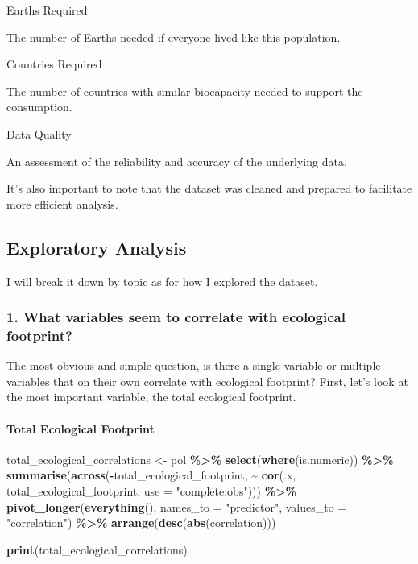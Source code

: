 \documentclass[
]{article}
\newenvironment{Shaded}{\begin{snugshade}}{\end{snugshade}}
\newcommand{\AttributeTok}[1]{\textcolor[rgb]{0.13,0.29,0.53}{#1}}
\newcommand{\FunctionTok}[1]{\textcolor[rgb]{0.13,0.29,0.53}{\textbf{#1}}}
\newcommand{\NormalTok}[1]{#1}
\newcommand{\OtherTok}[1]{\textcolor[rgb]{0.56,0.35,0.01}{#1}}
\newcommand{\SpecialCharTok}[1]{\textcolor[rgb]{0.81,0.36,0.00}{\textbf{#1}}}
\newcommand{\StringTok}[1]{\textcolor[rgb]{0.31,0.60,0.02}{#1}}
\begin{document}
Earths Required

The number of Earths needed if everyone lived like this population.

Countries Required

The number of countries with similar biocapacity needed to support the
consumption.

Data Quality

An assessment of the reliability and accuracy of the underlying data.

It's also important to note that the dataset was cleaned and prepared to
facilitate more efficient analysis.

\subsection{Exploratory Analysis}\label{exploratory-analysis}

I will break it down by topic as for how I explored the dataset.

\subsubsection{1. What variables seem to correlate with ecological
footprint?}\label{what-variables-seem-to-correlate-with-ecological-footprint}

The most obvious and simple question, is there a single variable or
multiple variables that on their own correlate with ecological
footprint? First, let's look at the most important variable, the total
ecological footprint.

\paragraph{Total Ecological Footprint}\label{total-ecological-footprint}

\begin{Shaded}
\begin{Highlighting}[]
\NormalTok{total\_ecological\_correlations }\OtherTok{\textless{}{-}}\NormalTok{ pol }\SpecialCharTok{\%\textgreater{}\%}
  \FunctionTok{select}\NormalTok{(}\FunctionTok{where}\NormalTok{(is.numeric)) }\SpecialCharTok{\%\textgreater{}\%}
  \FunctionTok{summarise}\NormalTok{(}\FunctionTok{across}\NormalTok{(}\SpecialCharTok{{-}}\NormalTok{total\_ecological\_footprint, }
                   \SpecialCharTok{\textasciitilde{}} \FunctionTok{cor}\NormalTok{(.x, total\_ecological\_footprint, }\AttributeTok{use =} \StringTok{"complete.obs"}\NormalTok{))) }\SpecialCharTok{\%\textgreater{}\%}
  \FunctionTok{pivot\_longer}\NormalTok{(}\FunctionTok{everything}\NormalTok{(), }\AttributeTok{names\_to =} \StringTok{"predictor"}\NormalTok{, }\AttributeTok{values\_to =} \StringTok{"correlation"}\NormalTok{) }\SpecialCharTok{\%\textgreater{}\%}
  \FunctionTok{arrange}\NormalTok{(}\FunctionTok{desc}\NormalTok{(}\FunctionTok{abs}\NormalTok{(correlation)))}

\FunctionTok{print}\NormalTok{(total\_ecological\_correlations)}
\end{Highlighting}
\end{Shaded}
\end{document}
